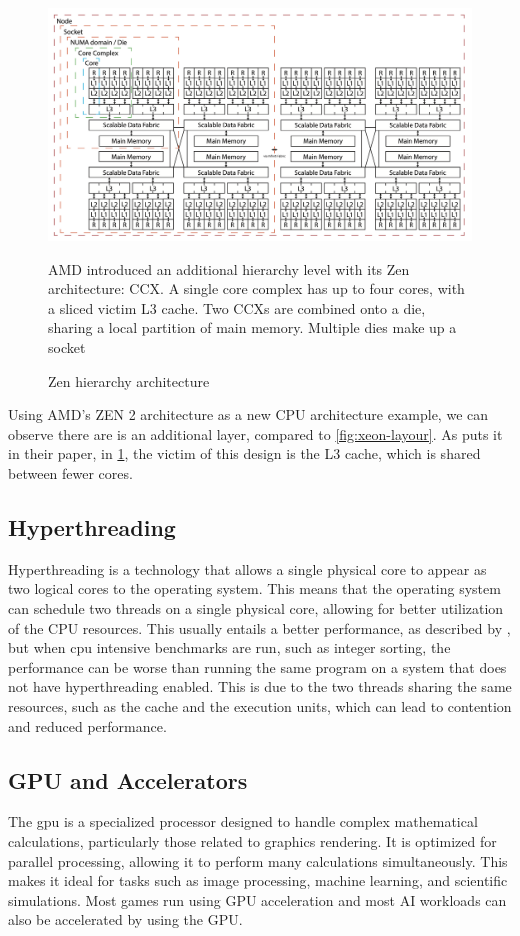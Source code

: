 \begin{figure}
    \centering
    \includegraphics[width=0.85\linewidth]{img/ccx-zen2-layout.png}
    \caption{Zen hierarchy architecture}{AMD introduced an additional hierarchy level with its Zen architecture: \gls{CCX}. A single core complex has up to four cores, with a sliced victim L3 cache. Two \glspl{CCX} are combined onto a die, sharing a local partition of main memory. Multiple dies make up a socket}
    \label{fig:zen2-architecture}
\end{figure}

Using AMD's ZEN 2 architecture as a new CPU architecture example, we can observe there are is an additional layer, compared to \autoref{fig:xeon-layour}. As \textcite{zen2-architecture} puts it in their paper, in \ref{fig:zen2-architecture}, the victim of this design is the L3 cache, which is shared between fewer cores.


\subsection{Hyperthreading}
\label{sec:hyperthreading}
Hyperthreading is a technology that allows a single physical core to appear as two logical cores to the operating system. This means that the operating system can schedule two threads on a single physical core, allowing for better utilization of the CPU resources. This usually entails a better performance, as described by \textcite{hyperthreading}, but when \gls{cpu} intensive benchmarks are run, such as integer sorting, the performance can be worse than running the same program on a system that does not have hyperthreading enabled. This is due to the two threads sharing the same resources, such as the cache and the execution units, which can lead to contention and reduced performance.


\subsection{GPU and Accelerators}
\label{sec:gpu-accelerators}
The \gls{gpu} is a specialized processor designed to handle complex mathematical calculations, particularly those related to graphics rendering. It is optimized for parallel processing, allowing it to perform many calculations simultaneously. This makes it ideal for tasks such as image processing, machine learning, and scientific simulations. Most games run using GPU acceleration and most AI workloads can also be accelerated by using the GPU. 

